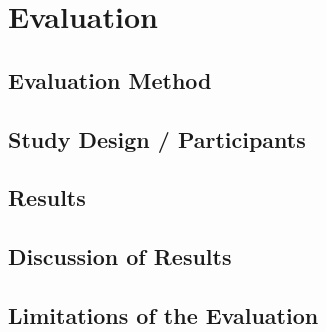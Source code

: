 \section{Evaluation}
\label{chap:evaluation}

\subsection{Evaluation Method}
\label{sec:evaluationMethod}

\subsection{Study Design / Participants}
\label{sec:studyDesign}

\subsection{Results}
\label{sec:evaluationResults}

\subsection{Discussion of Results}
\label{sec:discussionOfResults}

\subsection{Limitations of the Evaluation}
\label{sec:evaluationLimitations}
